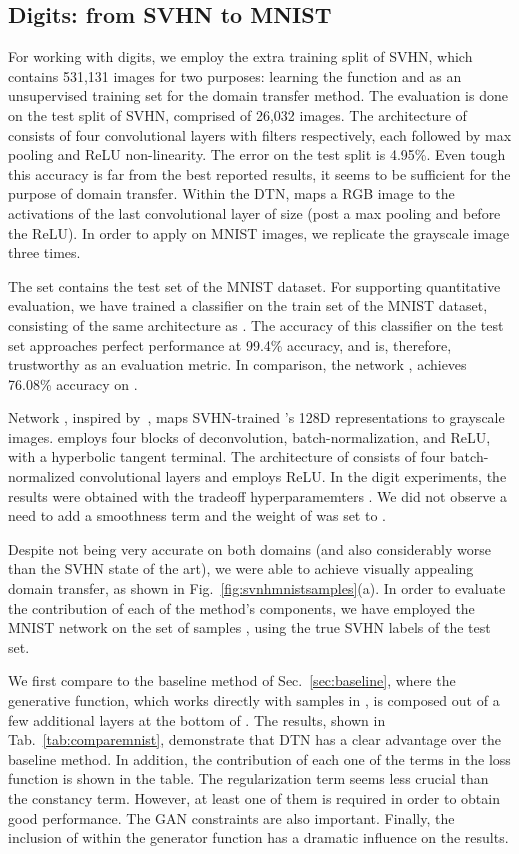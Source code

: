 \documentclass{article} \usepackage{iclr2017_conference,times}
\begin{document}
\subsection{Digits: from SVHN to MNIST}

For working with digits, we employ the extra training split of SVHN, which contains 531,131 images for two purposes: learning the function  and as an unsupervised training set  for the domain transfer method. The evaluation is done on the test split of SVHN, comprised of 26,032 images. The architecture of  consists of four convolutional layers with  filters respectively, each followed by max pooling and ReLU non-linearity. The error on the test split is 4.95\%. Even tough this accuracy is far from the best reported results, it seems to be sufficient for the purpose of domain transfer. Within the DTN,  maps a  RGB image to the activations of the last convolutional layer of size  (post a  max pooling and before the ReLU). In order to apply  on MNIST images, we replicate the grayscale image three times.

The set  contains the test set of the MNIST dataset. For supporting quantitative evaluation, we have trained a classifier on the train set of the MNIST dataset, consisting of the same architecture as . The accuracy of this classifier on the test set approaches perfect performance at 99.4\% accuracy, and is, therefore, trustworthy as an evaluation metric. In comparison, the network , achieves 76.08\% accuracy on . 

Network , inspired by~\cite{dcgan}, maps SVHN-trained 's 128D representations to  grayscale images.  employs four blocks of deconvolution, batch-normalization, and ReLU, with a hyperbolic tangent terminal. The architecture of  consists of four batch-normalized convolutional layers and employs ReLU. In the digit experiments, the results were obtained with the tradeoff hyperparamemters . We did not observe a need to add a smoothness term and the weight of  was set to . 

Despite not being very accurate on both domains (and also considerably worse than the SVHN state of the art), we were able to achieve visually appealing domain transfer, as shown in Fig.~\ref{fig:svnhmnistsamples}(a). In order to evaluate the contribution of each of the method's components, we have employed the MNIST network on the set of samples , using the true SVHN labels of the test set. 

We first compare to the baseline method of Sec.~\ref{sec:baseline}, where the generative function, which works directly with samples in , is composed out of a few additional layers at the bottom of . The results, shown in Tab.~\ref{tab:comparemnist}, demonstrate that DTN has a clear advantage over the baseline method. In addition, the contribution of each one of the terms in the loss function is shown in the table. The regularization term  seems less crucial than the constancy term. However, at least one of them is required in order to obtain good performance. The GAN constraints are also important. Finally, the inclusion of  within the generator function  has a dramatic influence on the results. 
\end{document}
